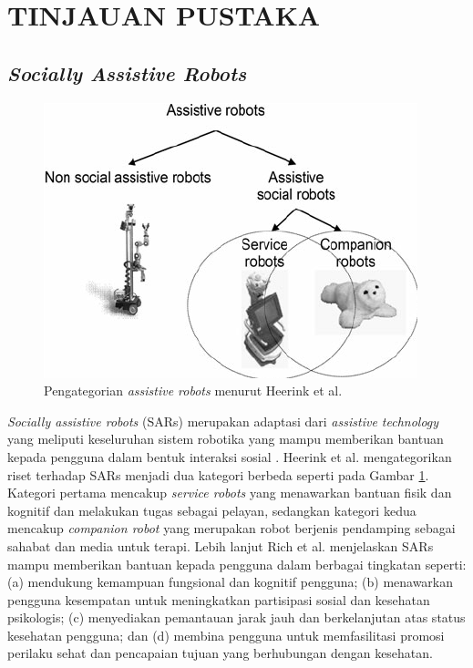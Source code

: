 \section{TINJAUAN PUSTAKA}

\subsection{\emph{Socially Assistive Robots}}

\begin{figure} [ht] \centering
  \includegraphics[scale=0.50]{gambar/robots-category.png}
  \caption{Pengategorian \emph{assistive robots} menurut Heerink et al. \citep{Heerink2010}}
  \label{fig:RobotsCategory}
\end{figure}

\emph{Socially assistive robots} (SARs) merupakan adaptasi dari \emph{assistive technology} yang meliputi keseluruhan sistem robotika yang mampu memberikan bantuan kepada pengguna dalam bentuk interaksi sosial \citep{Seifer2005}. Heerink et al. \citep{Heerink2010} mengategorikan riset terhadap SARs menjadi dua kategori berbeda seperti pada Gambar \ref{fig:RobotsCategory}.
Kategori pertama mencakup \emph{service robots} yang menawarkan bantuan fisik dan kognitif dan melakukan tugas sebagai pelayan, sedangkan kategori kedua mencakup \emph{companion robot} yang merupakan robot berjenis pendamping sebagai sahabat dan media untuk terapi.
Lebih lanjut Rich et al. \citep{Rich2009} menjelaskan SARs mampu memberikan bantuan kepada pengguna dalam berbagai tingkatan seperti:
(a) mendukung kemampuan fungsional dan kognitif pengguna;
(b) menawarkan pengguna kesempatan untuk meningkatkan partisipasi sosial dan kesehatan psikologis;
(c) menyediakan pemantauan jarak jauh dan berkelanjutan atas status kesehatan pengguna;
dan (d) membina pengguna untuk memfasilitasi promosi perilaku sehat dan pencapaian tujuan yang berhubungan dengan kesehatan.

